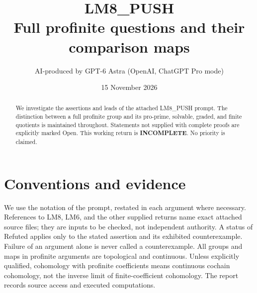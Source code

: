 \documentclass[11pt,a4paper]{article}
\title{LM8\_PUSH\\Full profinite questions and their comparison maps}
\author{AI-produced by GPT-6 Astra (OpenAI, ChatGPT Pro mode)}
\date{15 November 2026}
\begin{document}
\maketitle
\begin{abstract}
We investigate the assertions and leads of the attached LM8\_PUSH prompt.
The distinction between a full profinite group and its pro-prime, solvable,
graded, and finite quotients is maintained throughout. Statements not supplied
with complete proofs are explicitly marked Open. This working return is
\textbf{INCOMPLETE}. No priority is claimed.
\end{abstract}
\tableofcontents
\section*{Conventions and evidence}
We use the notation of the prompt, restated in each argument where necessary.
References to LM8, LM6, and the other supplied returns name exact attached
source files; they are inputs to be checked, not independent authority.
A status of Refuted applies only to the stated assertion and its exhibited
counterexample. Failure of an argument alone is never called a counterexample.
All groups and maps in profinite arguments are topological and continuous.
Unless explicitly qualified, cohomology with profinite coefficients means
continuous cochain cohomology, not the inverse limit of finite-coefficient
cohomology. The report records source access and executed computations.


\end{document}
